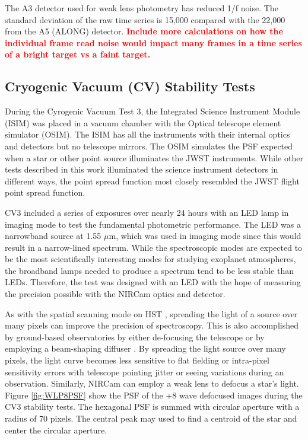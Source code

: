 \documentclass{aastex62}
\begin{document}
The A3 detector used for weak lens photometry has reduced 1/f noise.
The standard deviation of the raw time series is 15,000 compared with the 22,000 from the A5 (ALONG) detector.
\textcolor{red}{\bf Include more calculations on how the individual frame read noise would impact many frames in a time series of a bright target vs a faint target.}

\subsection{Cryogenic Vacuum (CV) Stability Tests}

During the Cyrogenic Vacuum Test 3, the Integrated Science Instrument Module (ISIM) was placed in a vacuum chamber with the Optical telescope element simulator (OSIM).
The ISIM has all the instruments with their internal optics and detectors but no telescope mirrors.
The OSIM simulates the PSF expected when a star or other point source illuminates the JWST instruments.
While other tests described in this work illuminated the science instrument detectors in different ways, the point spread function most closely resembled the JWST flight point spread function.

CV3 included a series of exposures over nearly 24 hours with an LED lamp in imaging mode to test the fundamental photometric performance.
The LED was a narrowband source at 1.55 $\mu$m, which was used in imaging mode since this would result in a narrow-lined spectrum.
While the spectroscopic modes are expected to be the most scientifically interesting modes for studying exoplanet atmospheres, the broadband lamps needed to produce a spectrum tend to be less stable than LEDs.
Therefore, the test was designed with an LED with the hope of measuring the precision possible with the NIRCam optics and detector.

As with the spatial scanning mode on HST \citep[e.g.][]{mccullough2012spatialScan,deming13}, spreading the light of a source over many pixels can improve the precision of spectroscopy.
This is also accomplished by ground-based observatories by either de-focusing the telescope \citep{southworth2009defocusing} or by employing a beam-shaping diffuser \citep{stefansson2017diffusers}.
By spreading the light source over many pixels, the light curve becomes less sensitive to flat fielding or intra-pixel sensitivity errors with telescope pointing jitter or seeing variations during an observation.
Similarly, NIRCam can employ a weak lens to defocus a star's light.
Figure \ref{fig:WLP8PSF} show the PSF of the +8 wave defocused images during the CV3 stability tests.
The hexagonal PSF is summed with circular aperture with a radius of 70 pixels.
The central peak may used to find a centroid of the star and center the circular aperture.
\end{document}
